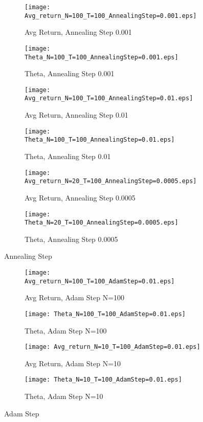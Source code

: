 \documentclass{article}
\begin{document}
\begin{figure}
	\centering
	\begin{subfigure}[b]{0.49\textwidth}
		\centering
		\texttt{[image: Avg\_return\_N=100\_T=100\_AnnealingStep=0.001.eps]}
		\caption{Avg Return, Annealing Step 0.001}
	\end{subfigure}
	\begin{subfigure}[b]{0.49\textwidth}
		\centering
		\texttt{[image: Theta\_N=100\_T=100\_AnnealingStep=0.001.eps]}
		\caption{Theta, Annealing Step 0.001}
	\end{subfigure}

	\begin{subfigure}[b]{0.49\textwidth}
		\centering
		\texttt{[image: Avg\_return\_N=100\_T=100\_AnnealingStep=0.01.eps]}
		\caption{Avg Return, Annealing Step 0.01}
	\end{subfigure}
	\begin{subfigure}[b]{0.49\textwidth}
		\centering
		\texttt{[image: Theta\_N=100\_T=100\_AnnealingStep=0.01.eps]}
		\caption{Theta, Annealing Step 0.01}
	\end{subfigure}

	\begin{subfigure}[b]{0.49\textwidth}
		\centering
		\texttt{[image: Avg\_return\_N=20\_T=100\_AnnealingStep=0.0005.eps]}
		\caption{Avg Return, Annealing Step 0.0005}
	\end{subfigure}
	\begin{subfigure}[b]{0.49\textwidth}
		\centering
		\texttt{[image: Theta\_N=20\_T=100\_AnnealingStep=0.0005.eps]}
		\caption{Theta, Annealing Step 0.0005}
	\end{subfigure}
	\caption{Annealing Step}
	\label{fig:annealing}
\end{figure}


\begin{figure}
	\centering
	\begin{subfigure}[b]{0.49\textwidth}
		\centering
		\texttt{[image: Avg\_return\_N=100\_T=100\_AdamStep=0.01.eps]}
		\caption{Avg Return, Adam Step N=100}
	\end{subfigure}
	\begin{subfigure}[b]{0.49\textwidth}
		\centering
		\texttt{[image: Theta\_N=100\_T=100\_AdamStep=0.01.eps]}
		\caption{Theta, Adam Step N=100}
	\end{subfigure}
	
	\begin{subfigure}[b]{0.49\textwidth}
		\centering
		\texttt{[image: Avg\_return\_N=10\_T=100\_AdamStep=0.01.eps]}
		\caption{Avg Return, Adam Step N=10}
	\end{subfigure}
	\begin{subfigure}[b]{0.49\textwidth}
		\centering
		\texttt{[image: Theta\_N=10\_T=100\_AdamStep=0.01.eps]}
		\caption{Theta, Adam Step N=10}
	\end{subfigure}
	\caption{Adam Step}
	\label{fig:adam}
\end{figure}
\end{document}
